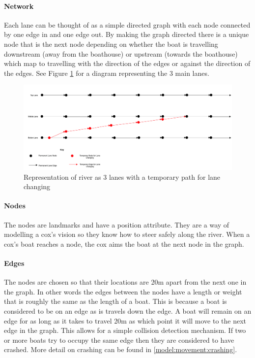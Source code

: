       \paragraph{Network}
      Each lane can be thought of as a simple directed graph with each node connected by one edge in and one edge out. By making the graph directed there is a unique node that is the next node depending on whether the boat is travelling downstream (away from the boathouse) or upstream (towards the boathouse) which map to travelling with the direction of the edges or against the direction of the edges. See Figure \ref{fig:model:lanes} for a diagram representing the 3 main lanes.
      
      \begin{figure}[h]
      \begin{center}
      	\includegraphics[scale=0.3]{images/lanes.png}
      	\caption{Representation of river as 3 lanes with a temporary path for lane changing}
      	\label{fig:model:lanes}
      \end{center}
      \end{figure}
      
      \paragraph{Nodes}  
      The nodes are landmarks and have a position attribute. They are a way of modelling a cox's vision so they know how to steer safely along the river. When a cox's boat reaches a node, the cox aims the boat at the next node in the graph.
      
      \paragraph{Edges}
      The nodes are chosen so that their locations are 20m apart from the next one in the graph. In other words the edges between the nodes have a length or weight that is roughly the same as the length of a boat. This is because a boat is considered to be on an edge as is travels down the edge. A boat will remain on an edge for as long as it takes to travel 20m as which point it will move to the next edge in the graph. This allows for a simple collision detection mechanism. If two or more boats try to occupy the same edge then they are considered to have crashed. More detail on crashing can be found in \ref{model:movement:crashing}.
        

